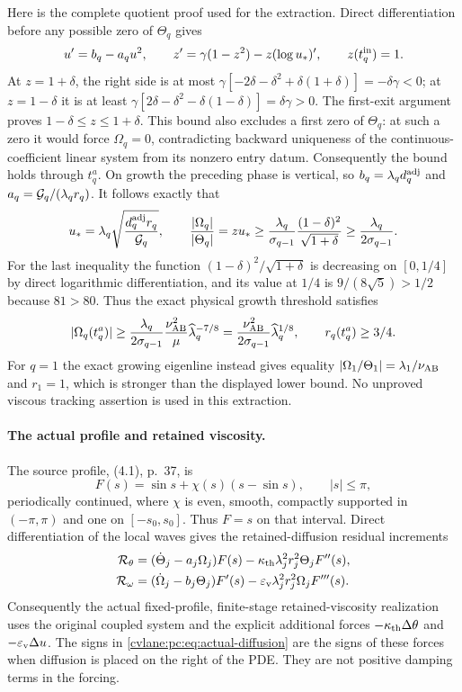 Here is the complete quotient proof used for the extraction. Direct differentiation before any possible zero of $\Theta_q$ gives
\[
 u'=b_q-a_qu^2,\qquad z'=\gamma(1-z^2)-z(\log u_*)',\qquad z(t_q^{\rm in})=1.
\]
At $z=1+\delta$, the right side is at most
$\gamma[-2\delta-\delta^2+\delta(1+\delta)]=-\delta\gamma<0$;
at $z=1-\delta$ it is at least
$\gamma[2\delta-\delta^2-\delta(1-\delta)]=\delta\gamma>0$.
The first-exit argument proves $1-\delta\le z\le1+\delta$. This bound also excludes a first zero of $\Theta_q$: at such a zero it would force $\Omega_q=0$, contradicting backward uniqueness of the continuous-coefficient linear system from its nonzero entry datum. Consequently the bound holds through $t_q^a$.
On growth the preceding phase is vertical, so $b_q=\lambda_qd_q^{\rm adj}$ and $a_q=\mathcal G_q/(\lambda_qr_q)$. It follows exactly that
\[
 u_*=\lambda_q\sqrt{\frac{d_q^{\rm adj}r_q}{\mathcal G_q}},\qquad
 \frac{|\Omega_q|}{|\Theta_q|}=zu_*
 \ge\frac{\lambda_q}{\sigma_{q-1}}
 \frac{(1-\delta)^2}{\sqrt{1+\delta}}
 \ge\frac{\lambda_q}{2\sigma_{q-1}}.
\]
For the last inequality the function $(1-\delta)^2/\sqrt{1+\delta}$ is decreasing on $[0,1/4]$ by direct logarithmic differentiation, and its value at $1/4$ is $9/(8\sqrt5)>1/2$ because $81>80$. Thus the exact physical growth threshold satisfies
\begin{equation}\label{cvlane:pc:eq:omega-lower}
 |\Omega_q(t_q^a)|\ge\frac{\lambda_q}{2\sigma_{q-1}}
 \frac{\nu_{\mathrm{AB}}^2}{\mu}\widehat\lambda_q^{-7/8}
 =\frac{\nu_{\mathrm{AB}}^2}{2\sigma_{q-1}}\widehat\lambda_q^{1/8},
 \qquad r_q(t_q^a)\ge3/4.
\end{equation}
For $q=1$ the exact growing eigenline instead gives equality $|\Omega_1/\Theta_1|=\lambda_1/\nu_{\mathrm{AB}}$ and $r_1=1$, which is stronger than the displayed lower bound. No unproved viscous tracking assertion is used in this extraction.

\paragraph{The actual profile and retained viscosity.}
The source profile, (4.1), p.~37, is
\[
 F(s)=\sin s+\chi(s)(s-\sin s),\qquad |s|\le\pi,
\]
periodically continued, where $\chi$ is even, smooth, compactly supported in $(-\pi,\pi)$ and one on $[-s_0,s_0]$. Thus $F=s$ on that interval. Direct differentiation of the local waves gives the retained-diffusion residual increments
\begin{align}
 \mathcal R_\theta&=(\dot\Theta_j-a_j\Omega_j)F(s)-\kappa_{\mathrm{th}}\lambda_j^2r_j^2\Theta_jF''(s),\label{cvlane:pc:eq:actual-diffusion}\\
 \mathcal R_\omega&=(\dot\Omega_j-b_j\Theta_j)F'(s)-\varepsilon_{\mathrm v}\lambda_j^2r_j^2\Omega_jF'''(s).\nonumber
\end{align}
Consequently the actual fixed-profile, finite-stage retained-viscosity realization uses the original coupled system and the explicit additional forces $-\kappa_{\mathrm{th}}\Delta\theta$ and $-\varepsilon_{\mathrm v}\Delta u$. The signs in \eqref{cvlane:pc:eq:actual-diffusion} are the signs of these forces when diffusion is placed on the right of the PDE. They are not positive damping terms in the forcing.

